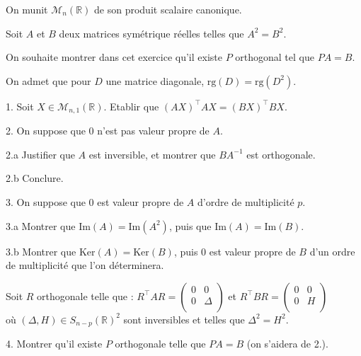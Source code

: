 \noindent On munit $\mathcal{M}_n(\mathbb{R})$ de son produit scalaire canonique.

\noindent Soit $A$ et $B$ deux matrices symétrique réelles telles que $A^2=B^2$.

\noindent On souhaite montrer dans cet exercice qu'il existe $P$ orthogonal tel que $PA = B$.

\noindent On admet que pour $D$ une matrice diagonale, $\mathrm{rg}(D) = \mathrm{rg}(D^2)$.

\vspace{5pt}
1. Soit $X \in \mathcal{M}_{n,1}(\mathbb{R})$. Etablir que $(AX)^\top AX = (BX)^\top BX$.

\vspace{5pt}
2. On suppose que $0$ n'est pas valeur propre de $A$.

\vspace{5pt}
\;\;\; 2.a Justifier que $A$ est inversible, et montrer que $BA^{-1}$ est orthogonale.

\vspace{5pt}
\;\;\; 2.b Conclure.

\vspace{5pt}
3. On suppose que $0$ est valeur propre de $A$ d'ordre de multiplicité $p$.

\vspace{5pt}
\;\;\; 3.a Montrer que $\mathrm{Im}(A) = \mathrm{Im}(A^2)$, puis que $\mathrm{Im}(A) = \mathrm{Im}(B)$.

\vspace{5pt}
\;\;\; 3.b Montrer que $\mathrm{Ker}(A) = \mathrm{Ker}(B)$, puis $0$ est valeur propre de $B$ d'un ordre de multiplicité que l'on déterminera.

\vspace{5pt}
\noindent Soit $R$ orthogonale telle que : $R^\top AR =
\begin{pmatrix}
0 & 0 \\
0 & \Delta \\
\end{pmatrix}
$
et $R^\top BR = 
\begin{pmatrix}
0 & 0 \\
0 & H \\
\end{pmatrix}
$ \\
où $(\Delta, H) \in S_{n-p}(\mathbb{R})^2$ sont inversibles et telles que $\Delta^2 = H^2$.

\vspace{5pt}
4. Montrer qu'il existe $P$ orthogonale telle que $PA = B$ (on s'aidera de 2.).

